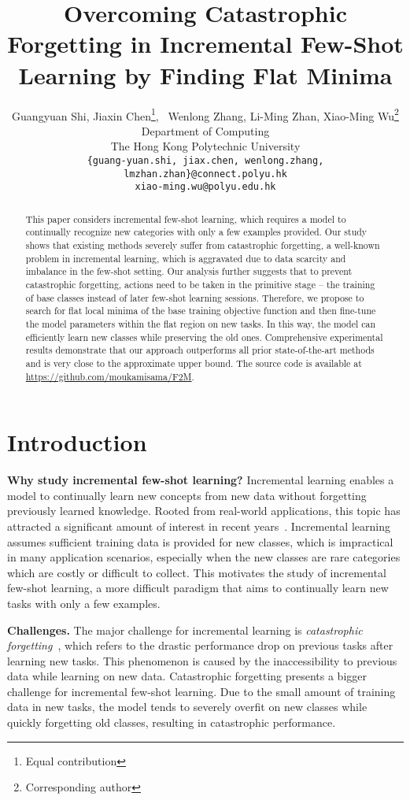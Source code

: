 \documentclass{article}
\title{Overcoming Catastrophic Forgetting in Incremental Few-Shot Learning by Finding Flat Minima}
\author{Guangyuan Shi, Jiaxin Chen\thanks{Equal contribution}, ~Wenlong Zhang, Li-Ming Zhan, Xiao-Ming Wu\thanks{Corresponding author}
  \\
  Department of Computing\\
  The Hong Kong Polytechnic University\\
  \texttt{\{guang-yuan.shi, jiax.chen, wenlong.zhang, lmzhan.zhan\}@connect.polyu.hk}\\
  \texttt{xiao-ming.wu@polyu.edu.hk}\\
}
\begin{document}
\maketitle

\begin{abstract}
 This paper considers incremental few-shot learning, which requires a model to continually recognize new categories with only a few examples provided. Our study shows that existing methods severely suffer from catastrophic forgetting, a well-known problem in incremental learning, which is aggravated due to data scarcity and imbalance in the few-shot setting. Our analysis further suggests that to prevent catastrophic forgetting, actions need to be taken in the primitive stage -- the training of base classes instead of later few-shot learning sessions. Therefore, we propose to search for flat local minima of the base training objective function and then fine-tune the model parameters within the flat region on new tasks. In this way, the model can efficiently learn new classes while preserving the old ones. Comprehensive experimental results demonstrate that our approach outperforms all prior state-of-the-art methods and is very close to the approximate upper bound. The source code is available at \url{https://github.com/moukamisama/F2M}.
\end{abstract} \section{Introduction}\label{sec:introduction}

\textbf{Why study incremental few-shot learning?} Incremental learning enables a model to continually learn new concepts from new data without forgetting previously learned knowledge. Rooted from real-world applications, this topic has attracted a significant amount of interest in recent years~\citep{chaudhry2018riemannian,kuzborskij2013n,Lwf,icarl,kemker2017fearnet}. Incremental learning assumes sufficient training data is provided for new classes, which is impractical in many application scenarios, especially when the new classes are rare categories which are costly or difficult to collect. This motivates the study of incremental few-shot learning, a more difficult paradigm that aims to continually learn new tasks with only a few examples. 

\textbf{Challenges.} The major challenge for incremental learning is \emph{catastrophic} \emph{forgetting}~\citep{goodfellow2013empirical,kirkpatrick2017overcoming,mccloskey1989catastrophic}, which refers to the drastic performance drop on previous tasks after learning new tasks. This phenomenon is caused by the inaccessibility to previous data while learning on new data. Catastrophic forgetting presents a bigger challenge for incremental few-shot learning. Due to the small amount of training data in new tasks, the model tends to severely overfit on new classes while quickly forgetting old classes, resulting in catastrophic performance.
 
\end{document}
